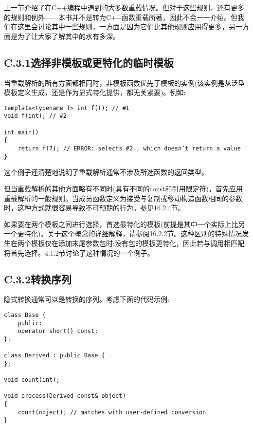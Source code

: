 
上一节介绍了在C++编程中遇到的大多数重载情况。但对于这些规则，还有更多的规则和例外——本书并不是转为C++函数重载所著，因此不会一一介绍。但我们在这里会讨论其中一些规则，一方面是因为它们比其他规则应用得更多，另一方面是为了让大家了解其中的水有多深。

\subsection{C.3.1\hspace{0.2cm}选择非模板或更特化的临时模板}

当重载解析的所有方面都相同时，非模板函数优先于模板的实例(该实例是从泛型模板定义生成，还是作为显式特化提供，都无关紧要)。例如:

\begin{lstlisting}[style=styleCXX]
template<typename T> int f(T); // #1
void f(int); // #2

int main()
{
	return f(7); // ERROR: selects #2 , which doesn’t return a value
}
\end{lstlisting}

这个例子还清楚地说明了重载解析通常不涉及所选函数的返回类型。

但当重载解析的其他方面略有不同时(具有不同的const和引用限定符)，首先应用重载解析的一般规则。当成员函数定义为接受与复制或移动构造函数相同的参数时，这种方式就很容易导致不可预期的行为。参见16.2.4节。

如果要在两个模板之间进行选择，首选最特化的模板(前提是其中一个实际上比另一个更特化)。关于这个概念的详细解释，请参阅16.2.2节。这种区别的特殊情况发生在两个模板仅在添加末尾参数包时:没有包的模板更特化，因此若与调用相匹配将首先选择。4.1.2节讨论了这种情况的一个例子。

\subsection{C.3.2\hspace{0.2cm}转换序列}

隐式转换通常可以是转换的序列。考虑下面的代码示例:

\begin{lstlisting}[style=styleCXX]
class Base {
	public:
	operator short() const;
};

class Derived : public Base {
};

void count(int);

void process(Derived const& object)
{
	count(object); // matches with user-defined conversion
}
\end{lstlisting}

